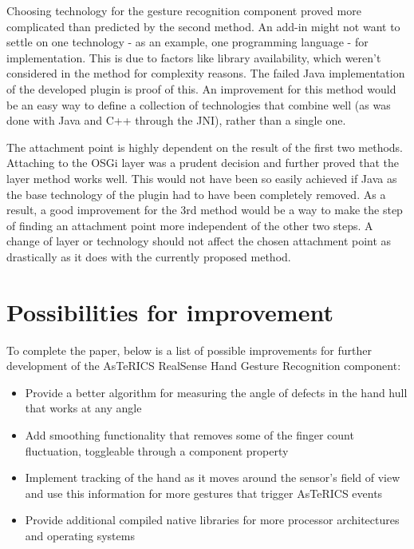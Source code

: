 \documentclass[BSA,Bachelor,english]{twbook}%
\newcommand{\FHTWCitationType}{IEEE} %
\begin{document}
Choosing technology for the gesture recognition component proved more complicated than predicted by the second method. An add-in might not want to settle on one technology - as an example, one programming language - for implementation. This is due to factors like library availability, which weren't considered in the method for complexity reasons. The failed Java implementation of the developed plugin is proof of this. An improvement for this method would be an easy way to define a collection of technologies that combine well (as was done with Java and C++ through the JNI), rather than a single one.

The attachment point is highly dependent on the result of the first two methods. Attaching to the OSGi layer was a prudent decision and further proved that the layer method works well. This would not have been so easily achieved if Java as the base technology of the plugin had to have been completely removed. As a result, a good improvement for the 3rd method would be a way to make the step of finding an attachment point more independent of the other two steps. A change of layer or technology should not affect the chosen attachment point as drastically as it does with the currently proposed method.

\section{Possibilities for improvement}

To complete the paper, below is a list of possible improvements for further development of the AsTeRICS RealSense Hand Gesture Recognition component:

\begin{itemize}
	\item Provide a better algorithm for measuring the angle of defects in the hand hull that works at any angle
	\item Add smoothing functionality that removes some of the finger count fluctuation, toggleable through a component property
	\item Implement tracking of the hand as it moves around the sensor's field of view and use this information for more gestures that trigger AsTeRICS events
	\item Provide additional compiled native libraries for more processor architectures and operating systems
\end{itemize}

%
%
\clearpage
\ifthenelse{\equal{\FHTWCitationType}{HARVARD}}{}{}

\clearpage
\end{document}
